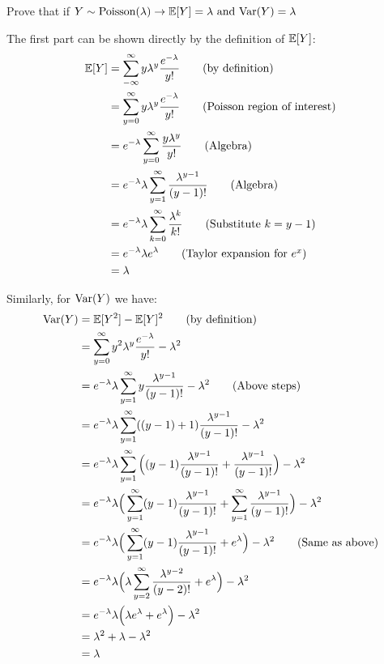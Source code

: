 
\item Prove that if $Y \sim  \text{Poisson}(\lambda) \rightarrow \mathbb{E}[Y]  =  \lambda \text{ and }  \text{Var}(Y) = \lambda$

    The first part can be shown directly by the definition of $\mathbb{E}[Y]$:
    \begin{align*}
        \mathbb{E}[Y] &= \sum_{-\infty}^\infty y\lambda^{y} \frac{e^{-\lambda}}{y!} \tag*{(by definition)}\\
                  &= \sum_{y=0}^\infty y \lambda^{y} \frac{e^{-\lambda}}{y!} \tag*{(Poisson region of interest)}\\
                  &= e^{-\lambda}\sum_{y=0}^\infty \frac{y \lambda^y}{y!} \tag*{(Algebra)}\\
                  &= e^{-\lambda}\lambda \sum_{y=1}^\infty \frac{\lambda^{y-1}}{(y-1)!} \tag*{(Algebra)}\\
                  &= e^{-\lambda}\lambda \sum_{k=0}^\infty \frac{\lambda^k}{k!} \tag*{(Substitute \(k=y-1\))}\\
                  &= e^{-\lambda}\lambda e^\lambda  \tag*{(Taylor expansion for \(e^x)\)}\\
                  &= \lambda 
    \end{align*}

    Similarly, for $\text{Var}(Y)$ we have:
    \begin{align*}
        \text{Var}(Y) &= \mathbb{E}[Y^2] - \mathbb{E}[Y]^2   \tag*{(by definition)}\\
                &= \sum_{y=0}^\infty y^2\lambda^{y} \frac{e^{-\lambda}}{y!} - \lambda^2\\
                &= e^{-\lambda}\lambda \sum_{y=1}^\infty y\frac{\lambda^{y-1}}{(y-1)!}- \lambda^2 \tag*{(Above steps)}\\
                &= e^{-\lambda}\lambda \sum_{y=1}^\infty ((y-1)+1)\frac{\lambda^{y-1}}{(y-1)!}- \lambda^2 \\
                &= e^{-\lambda}\lambda \sum_{y=1}^\infty \Big((y-1)\frac{\lambda^{y-1}}{(y-1)!} + \frac{\lambda^{y-1}}{(y-1)!}\Big)- \lambda^2 \\
                &= e^{-\lambda}\lambda \Big(\sum_{y=1}^\infty (y-1)\frac{\lambda^{y-1}}{(y-1)!} + \sum_{y=1}^\infty \frac{\lambda^{y-1}}{(y-1)!}\Big)- \lambda^2 \\
                &= e^{-\lambda}\lambda \Big(\sum_{y=1}^\infty (y-1)\frac{\lambda^{y-1}}{(y-1)!} +e^\lambda \Big)- \lambda^2 \tag*{(Same as above)}\\
                &= e^{-\lambda}\lambda \Big(\lambda \sum_{y=2}^\infty \frac{\lambda^{y-2}}{(y-2)!} +e^\lambda \Big)- \lambda^2 \\
                &= e^{-\lambda}\lambda \Big(\lambda e^\lambda +e^\lambda \Big)- \lambda^2 \\
                &= \lambda^2 + \lambda - \lambda^2 \\
                &=  \lambda  \\
    \end{align*}
